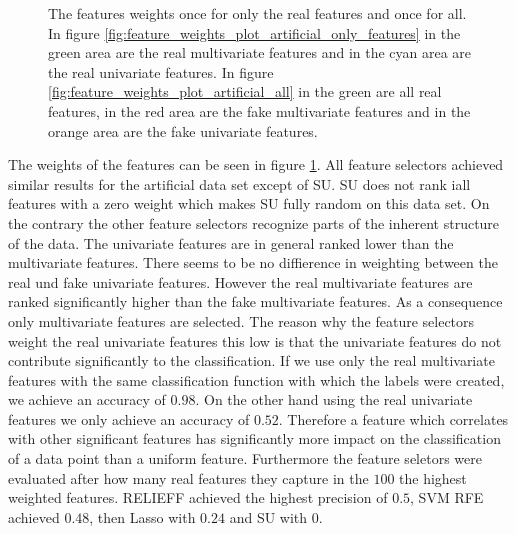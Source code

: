 \documentclass[twoside,11pt]{article}
\begin{document}
\begin{figure}
  \caption{The features weights  once for only the real features and once for all. In figure \ref{fig:feature_weights_plot_artificial_only_features} in the green area are the real multivariate features and in the cyan area are the real univariate features. In figure \ref{fig:feature_weights_plot_artificial_all} in the green are all real features, in the red area are the fake multivariate features and in the orange area are the fake univariate features. }
  \label{fig:feature_weights_plot_artificial}
\end{figure}
The weights of the features can be seen in figure \ref{fig:feature_weights_plot_artificial}.
All feature selectors achieved similar results for the artificial data set except of SU. SU does not rank iall features with a zero weight which makes SU fully random on this data set. On the contrary the other feature selectors recognize parts of the inherent structure of the data. The univariate features are in general ranked lower than the multivariate features. There seems to be no diffierence in weighting between the real und fake univariate features. However the real multivariate features are ranked significantly higher than the fake multivariate features. As a consequence only multivariate features are selected. The reason why the feature selectors weight the real univariate features this low is that the univariate features do not contribute significantly to the classification. If we use only the real multivariate features with the same classification function with which the labels were created, we achieve an accuracy of $0.98$. On the other hand using the real univariate features we only achieve an accuracy of $0.52$. Therefore a feature which correlates with other significant features has significantly more impact on the classification of a data point than a uniform feature.
Furthermore the feature seletors were evaluated after how many real features they capture in the $100$ the highest weighted features. RELIEFF achieved the highest precision of $0.5$, SVM RFE achieved $0.48$, then Lasso with $0.24$ and SU with $0$.


\end{document}
